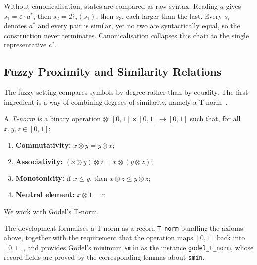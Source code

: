 Without canonicalisation, states are compared as raw syntax. Reading $a$ gives
$s_1=\varepsilon\cdot a^{*}$, then $s_2=\mathcal{D}_a(s_1)$, then $s_3$, each larger
than the last. Every $s_i$ denotes $a^{*}$ and every pair is similar, yet no two are
syntactically equal, so the construction never terminates. Canonicalisation collapses
this chain to the single representative $a^{*}$.

\begin{center}
\end{center}

\subsection{Fuzzy Proximity and Similarity Relations}\label{sec:fuzzy-relations}

The fuzzy setting compares symbols by degree rather than by equality. The first
ingredient is a way of combining degrees of similarity, namely a
T-norm~\cite{met05}.

\begin{definition}[T-norm]
A \emph{T-norm} is a binary operation $\otimes:[0,1]\times[0,1]\to[0,1]$ such that,
for all $x,y,z\in[0,1]$:
\begin{enumerate}
  \item \textbf{Commutativity:} $x\otimes y = y\otimes x$;
  \item \textbf{Associativity:} $(x\otimes y)\otimes z = x\otimes (y\otimes z)$;
  \item \textbf{Monotonicity:} if $x\le y$, then $x\otimes z \le y\otimes z$;
  \item \textbf{Neutral element:} $x\otimes 1 = x$.
\end{enumerate}
\end{definition}

\noindent We work with Gödel's T-norm.

\medskip
The development formalises a T-norm as a record \texttt{T\_norm} bundling
the axioms above, together with the requirement that the operation maps $[0,1]$ back
into $[0,1]$, and provides Gödel's minimum \texttt{smin} as the instance
\texttt{godel\_t\_norm}, whose record fields are proved by the corresponding lemmas
about \texttt{smin}.

